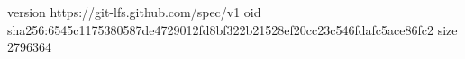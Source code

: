 version https://git-lfs.github.com/spec/v1
oid sha256:6545c1175380587de4729012fd8bf322b21528ef20cc23c546fdafc5ace86fc2
size 2796364
